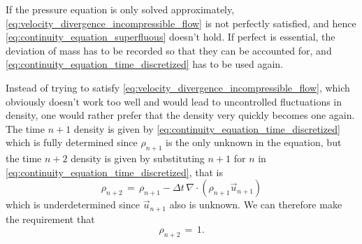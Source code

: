 If the pressure equation is only solved approximately, \eqref{eq:velocity_divergence_incompressible_flow} is not perfectly satisfied, and hence \eqref{eq:continuity_equation_superfluous} doesn't hold. If perfect  is essential, the deviation of mass has to be recorded so that they can be accounted for, and \eqref{eq:continuity_equation_time_discretized} has to be used again.

Instead of trying to satisfy \eqref{eq:velocity_divergence_incompressible_flow}, which obviously doesn't work too well and would lead to uncontrolled fluctuations in density, one would rather prefer that the density very quickly becomes one again. The time $n+1$ density is given by \eqref{eq:continuity_equation_time_discretized} which is fully determined since $\rho_{n+1}$ is the only unknown in the equation, but the time $n+2$ density is given by substituting $n+1$ for $n$ in \eqref{eq:continuity_equation_time_discretized}, that is
%
\begin{equation} \label{eq:continuity_equation_time_discretized_postponed}
\rho_{n+2} \,=\, \rho_{n+1} - \Delta t\,\nabla\cdot(\rho_{n+1}\vec{u}_{n+1})
\end{equation}
%
which is underdetermined since $\vec{u}_{n+1}$ also is unknown. We can therefore make the requirement that
%
\begin{equation} \label{eq:density_conservation}
\rho_{n+2} \,=\, 1.
\end{equation}

